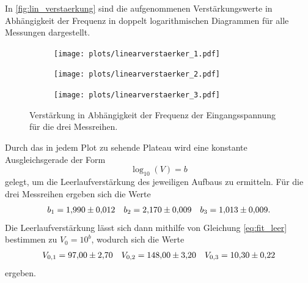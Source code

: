 In \autoref{fig:lin_verstaerkung} sind die aufgenommenen Verstärkungswerte in Abhängigkeit der Frequenz in doppelt logarithmischen Diagrammen für alle Messungen dargestellt.

\begin{figure}[H]
  \centering
  \begin{subfigure}{.65\textwidth}
    \texttt{[image: plots/linearverstaerker\_1.pdf]}
  \end{subfigure}
  \begin{subfigure}{.65\textwidth}
    \texttt{[image: plots/linearverstaerker\_2.pdf]}
  \end{subfigure}
  \begin{subfigure}{.65\textwidth}
    \texttt{[image: plots/linearverstaerker\_3.pdf]}
  \end{subfigure}
  \caption{Verstärkung in Abhängigkeit der Frequenz der Eingangsspannung für die drei Messreihen.}
  \label{fig:lin_verstaerkung}
\end{figure}

Durch das in jedem Plot zu sehende Plateau wird eine konstante Ausgleichsgerade der Form
\begin{equation}
\log_{10} (V) = b
\label{eq:fit_leer}
\end{equation}
gelegt, um die Leerlaufverstärkung des jeweiligen Aufbaus zu ermitteln. Für die drei Messreihen ergeben sich die Werte
\begin{align*}
  b_1 = \num{1.99 \pm 0.012} && b_2 = \num{2.17 \pm 0.009} && b_3 = \num{1.013 \pm 0.009}.
\end{align*}
Die Leerlaufverstärkung lässt sich dann mithilfe von Gleichung \eqref{eq:fit_leer} bestimmen zu $V_0 = 10^{b}$, wodurch sich die Werte
\begin{align*}
  V_{0,1} = \num{97 \pm 2.70} && V_{0,2} = \num{148 \pm 3.20} && V_{0,3} = \num{10.3 \pm 0.22}
\end{align*}
ergeben.

